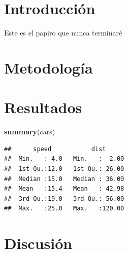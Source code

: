 \documentclass[12pt,twoside]{reedthesis}
\newenvironment{Shaded}{\begin{snugshade}}{\end{snugshade}}
\newcommand{\KeywordTok}[1]{\textcolor[rgb]{0.13,0.29,0.53}{\textbf{#1}}}
\newcommand{\NormalTok}[1]{#1}
\begin{document}
\hypertarget{introducciuxf3n}{%
\section{Introducción}\label{introducciuxf3n}}

Este es el papiro que nunca terminaré

\hypertarget{metodologuxeda}{%
\section{Metodología}\label{metodologuxeda}}

\hypertarget{resultados}{%
\section{Resultados}\label{resultados}}
\begin{Shaded}
\begin{Highlighting}[]
\KeywordTok{summary}\NormalTok{(cars)}
\end{Highlighting}
\end{Shaded}
\begin{verbatim}
##      speed           dist       
##  Min.   : 4.0   Min.   :  2.00  
##  1st Qu.:12.0   1st Qu.: 26.00  
##  Median :15.0   Median : 36.00  
##  Mean   :15.4   Mean   : 42.98  
##  3rd Qu.:19.0   3rd Qu.: 56.00  
##  Max.   :25.0   Max.   :120.00
\end{verbatim}
\hypertarget{discusiuxf3n}{%
\section{Discusión}\label{discusiuxf3n}}


\end{document}
